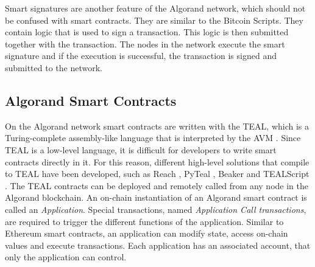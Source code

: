 Smart signatures are another feature of the Algorand network, which should not be confused with smart contracts. They are similar to the Bitcoin Scripts. They contain logic that is used to sign a transaction. This logic is then submitted together with the transaction.
The nodes in the network execute the smart signature and if the execution is successful, the transaction is signed and submitted to the network.

\subsection*{Algorand Smart Contracts} \label{section:algorand-smartcontracts}
On the Algorand network smart contracts are written with the \ac{TEAL}, which is a Turing-complete assembly-like language that is interpreted by the \ac{AVM} \cite{noauthor_introduction_nodate}.
Since \ac{TEAL} is a low-level language, it is difficult for developers to write smart contracts directly in it.
For this reason, different high-level solutions that compile to \ac{TEAL} have been developed, such as Reach \cite{noauthor_reach_nodate}, PyTeal \cite{noauthor_pyteal_nodate}, Beaker \cite{noauthor_beaker_nodate} and TEALScript \cite{noauthor_algorandfoundationtealscript_nodate}.
The \ac{TEAL} contracts can be deployed and remotely called from any node in the Algorand blockchain. An on-chain instantiation of an Algorand smart contract is called an \textit{Application}. Special transactions, named \textit{Application Call transactions}, are required to trigger the different functions of the application. Similar to Ethereum smart contracts, an application can modify state, access on-chain values and execute transactions. Each application has an associated account, that only the application can control.

